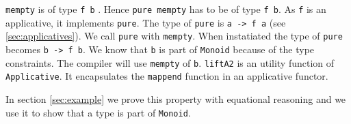 \verb|mempty| is of type \verb|f b| . Hence \verb|pure mempty| has to be of type \verb|f b|.
As \verb|f| is an applicative, it implements \verb|pure|. The type of \verb|pure| is \verb|a -> f a| (see \ref{sec:applicatives}). We call \verb|pure| with \verb|mempty|. When instatiated the type of \verb|pure| becomes \verb|b -> f b|.  We know that \verb|b| is part of \verb|Monoid| because of the type constraints. The compiler will use \verb|mempty| of \verb|b|.  \verb|liftA2| is an utility function of \verb|Applicative|. It encapsulates the \verb|mappend| function in an applicative functor. 



In section \ref{sec:example} we prove this property with equational reasoning and we use it to show that a type is part of \verb|Monoid|.
